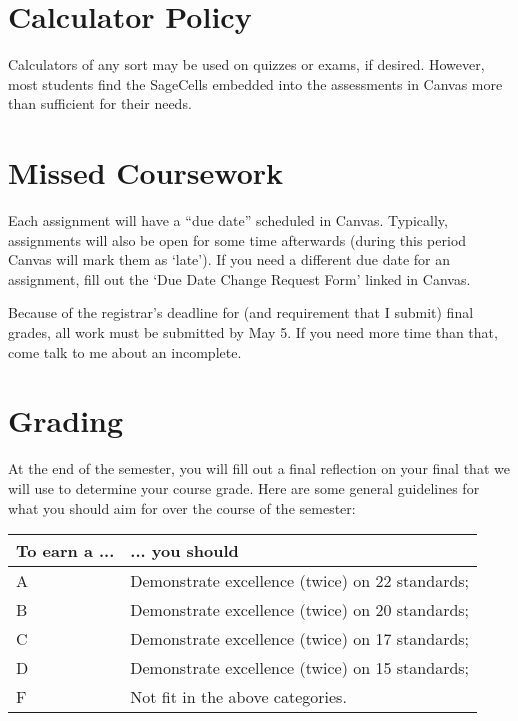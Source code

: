 \documentclass{article}
\begin{document}
\section*{\fontsize{12}{15}\selectfont Calculator Policy}

Calculators of any sort may be used on quizzes or exams, if desired. However, most students find the SageCells embedded into the assessments in Canvas more than sufficient for their needs.

\section*{\fontsize{12}{15}\selectfont Missed Coursework}
Each assignment will have a ``due date'' scheduled in Canvas.  Typically, assignments will also be open for some time afterwards (during this period Canvas will mark them as `late').  If you need a different due date for an assignment, fill out the `Due Date Change Request Form' linked in Canvas.  

Because of the registrar's deadline for (and requirement that I submit) final grades, all work must be submitted by May 5.  If you need more time than that, come talk to me about an incomplete.

\noindent \begin{minipage}{\textwidth}
\section*{\fontsize{12}{15}\selectfont Grading}
At the end of the semester, you will fill out a final reflection on your final that we will use to determine your course grade.  Here are some general guidelines for what you should aim for over the course of the semester: \\

\begin{center}
 \begin{tabular}{l|l} 
To earn a  ... & ... you should \\
\hline
A & Demonstrate excellence (twice) on 22 standards;  \\
\hline

B & Demonstrate excellence (twice) on 20 standards; \\
\hline

C 	& Demonstrate excellence (twice) on 17 standards;\\
\hline

D & Demonstrate excellence (twice) on 15 standards;\\
\hline

F 	& Not fit in the above categories. \\
\hline
\end{tabular}
\end{center}
\end{minipage}
\end{document}
